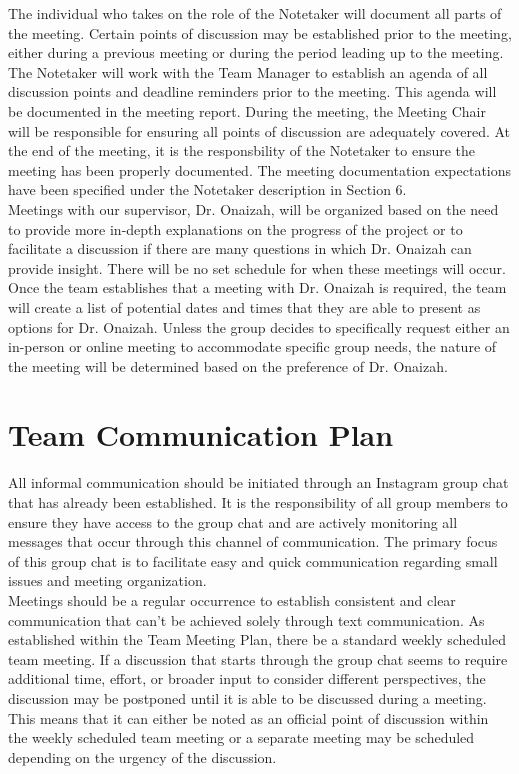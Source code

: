 \documentclass{article}
\begin{document}
The individual who takes on the role of the Notetaker will document all parts of the meeting. Certain points of
discussion may be established prior to the meeting, either during a previous meeting or during the period leading
up to the meeting. The Notetaker will work with the Team Manager to establish an agenda of all discussion points
and deadline reminders prior to the meeting. This agenda will be documented in the meeting report. During the
meeting, the Meeting Chair will be responsible for ensuring all points of discussion are adequately covered. At the
end of the meeting, it is the responsbility of the Notetaker to ensure the meeting has been properly documented.
The meeting documentation expectations have been specified under the Notetaker description in Section 6.\\

Meetings with our supervisor, Dr. Onaizah, will be organized based on the need to provide more in-depth explanations
on the progress of the project or to facilitate a discussion if there are many questions in which Dr. Onaizah can
provide insight. There will be no set schedule for when these meetings will occur. Once the team establishes that a
meeting with Dr. Onaizah is required, the team will create a list of potential dates and times that they are able
to present as options for Dr. Onaizah. Unless the group decides to specifically request either an in-person or
online meeting to accommodate specific group needs, the nature of the meeting will be determined based on the
preference of Dr. Onaizah.

\section{Team Communication Plan}

\iffalse
\wss{Issues on GitHub should be part of your communication plan.}
\fi

All informal communication should be initiated through an Instagram group chat that has already been established. It
is the responsibility of all group members to ensure they have access to the group chat and are actively monitoring
all messages that occur through this channel of communication. The primary focus of this group chat is to facilitate
easy and quick communication regarding small issues and meeting organization.\\

Meetings should be a regular occurrence to establish consistent and clear communication that can’t be achieved
solely through text communication. As established within the Team Meeting Plan, there be a standard weekly scheduled
team meeting. If a discussion that starts through the group chat seems to require additional time, effort, or
broader input to consider different perspectives, the discussion may be postponed until it is able to be discussed
during a meeting. This means that it can either be noted as an official point of discussion within the weekly
scheduled team meeting or a separate meeting may be scheduled depending on the urgency of the discussion.\\
\end{document}
